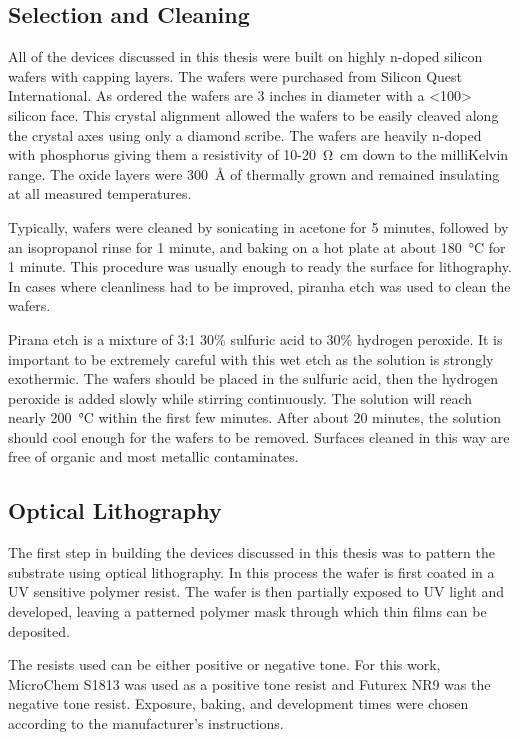 \subsection{Selection and Cleaning}

All of the devices discussed in this thesis were built on highly n-doped silicon wafers with  capping layers. The wafers were purchased from Silicon Quest International. As ordered the wafers are 3 inches in diameter with a <100> silicon face. This crystal alignment allowed the wafers to be easily cleaved along the crystal axes using only a diamond scribe. The wafers are heavily n-doped with phosphorus giving them a resistivity of 10-\SI{20}{\ohm\centi\meter} down to the milliKelvin range. The oxide layers were \SI{300}{\angstrom} of thermally grown  and remained insulating at all measured temperatures.

Typically, wafers were cleaned by sonicating in acetone for 5 minutes, followed by an isopropanol rinse for 1 minute, and baking on a hot plate at about \SI{180}{\degreeCelsius} for 1 minute. This procedure was usually enough to ready the surface for lithography. In cases where cleanliness had to be improved, piranha etch was used to clean the wafers. 

Pirana etch is a mixture of 3:1 30\% sulfuric acid to 30\% hydrogen peroxide. It is important to be extremely careful with this wet etch as the solution is strongly exothermic. The wafers should be placed in the sulfuric acid, then the hydrogen peroxide is added slowly while stirring continuously. The solution will reach nearly \SI{200}{\degreeCelsius} within the first few minutes. After about 20 minutes, the solution should cool enough for the wafers to be removed. Surfaces cleaned in this way are free of organic and most metallic contaminates.

\subsection{Optical Lithography}
\label{subsec:optical}

The first step in building the devices discussed in this thesis was to pattern the substrate using optical lithography. In this process the wafer is first coated in a UV sensitive polymer resist. The wafer is then partially exposed to UV light and developed, leaving a patterned polymer mask through which thin films can be deposited.

The resists used can be either positive or negative tone. For this work, MicroChem S1813 was used as a positive tone resist and Futurex NR9 was the negative tone resist. Exposure, baking, and development times were chosen according to the manufacturer's instructions.

